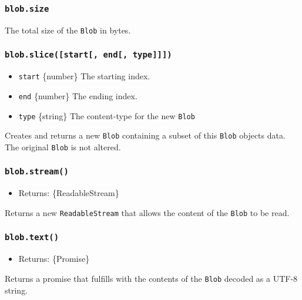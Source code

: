 \subsubsection{\texorpdfstring{\texttt{blob.size}}{blob.size}}\label{blob.size}

The total size of the \texttt{Blob} in bytes.

\subsubsection{\texorpdfstring{\texttt{blob.slice({[}start{[},\ end{[},\ type{]}{]}{]})}}{blob.slice({[}start{[}, end{[}, type{]}{]}{]})}}\label{blob.slicestart-end-type}

\begin{itemize}
\tightlist
\item
  \texttt{start} \{number\} The starting index.
\item
  \texttt{end} \{number\} The ending index.
\item
  \texttt{type} \{string\} The content-type for the new \texttt{Blob}
\end{itemize}

Creates and returns a new \texttt{Blob} containing a subset of this
\texttt{Blob} objects data. The original \texttt{Blob} is not altered.

\subsubsection{\texorpdfstring{\texttt{blob.stream()}}{blob.stream()}}\label{blob.stream}

\begin{itemize}
\tightlist
\item
  Returns: \{ReadableStream\}
\end{itemize}

Returns a new \texttt{ReadableStream} that allows the content of the
\texttt{Blob} to be read.

\subsubsection{\texorpdfstring{\texttt{blob.text()}}{blob.text()}}\label{blob.text}

\begin{itemize}
\tightlist
\item
  Returns: \{Promise\}
\end{itemize}

Returns a promise that fulfills with the contents of the \texttt{Blob}
decoded as a UTF-8 string.


